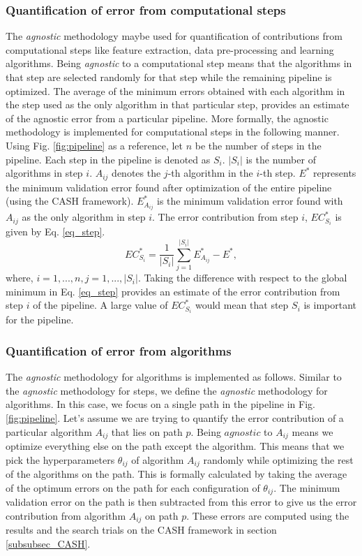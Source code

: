 \subsubsection{Quantification of error from computational steps}
\label{subsubsec_eq_steps}
The \textit{agnostic} methodology maybe used for quantification of contributions from computational steps like feature extraction, data pre-processing and learning algorithms. Being \textit{agnostic} to a computational step means that the algorithms in that step are selected randomly for that step while the remaining pipeline is optimized. The average of the minimum errors obtained with each algorithm in the step used as the only algorithm in that particular step, provides an estimate of the agnostic error from a particular pipeline.  
More formally, the agnostic methodology is implemented for computational steps in the following manner. Using Fig. \ref{fig:pipeline} as a reference, let $n$ be the number of steps in the pipeline. Each step in the pipeline is denoted as $S_i$. $|S_i|$ is the number of algorithms in step $i$. $A_{ij}$ denotes the $j$-th algorithm in the $i$-th step. $E^*$ represents the minimum validation error found after optimization of the entire pipeline (using the CASH framework). $E_{A_{ij}}^*$ is the minimum  validation error found with $A_{ij}$ as the only algorithm in step $i$. The error contribution from step $i$, $EC_{S_i}^*$ is given by Eq. \ref{eq_step}.
\begin{equation}
\label{eq_step}
EC_{S_i}^* = \frac{1}{|S_i|}\sum_{j=1}^{|S_i|} E_{A_{ij}}^* - E^*,
\end{equation}
where, $i = {1, ..., n}, j = {1, ..., |S_i|}$.
Taking the difference with respect to the global minimum in Eq. \ref{eq_step} provides an estimate of the error contribution from step $i$ of the pipeline. A large value of $EC_{S_i}^*$ would mean that step $S_i$ is important for the pipeline.

\subsubsection{Quantification of error from algorithms}
\label{subsubsec_eq_alg}
The \textit{agnostic} methodology for algorithms is implemented as follows. Similar to the \textit{agnostic} methodology for steps, we define the \textit{agnostic} methodology for algorithms. In this case, we focus on a single path in the pipeline in Fig. \ref{fig:pipeline}. Let's assume we are trying to quantify the error contribution of a particular algorithm $A_{ij}$ that lies on path $p$. Being $agnostic$ to $A_{ij}$ means we optimize everything else on the path except the algorithm. This means that we pick the hyperparameters $\theta_{ij}$ of algorithm $A_{ij}$ randomly while optimizing the rest of the algorithms on the path. This is formally calculated by taking the average of the optimum errors on the path for each configuration of $\theta_{ij}$. The minimum validation error on the path is then subtracted from this error to give us the error contribution from algorithm $A_{ij}$ on path $p$. These errors are computed using the results and the search trials on the CASH framework in section \ref{subsubsec_CASH}.

